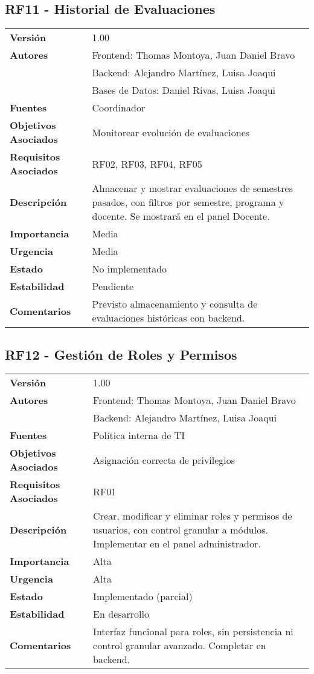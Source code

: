 \documentclass{article}
\begin{document}
\subsection*{RF11 - Historial de Evaluaciones}
\begin{longtable}{>{\bfseries}l p{}}
Versión & 1.00 \\
Autores & Frontend: Thomas Montoya, Juan Daniel Bravo \\ 
        & Backend: Alejandro Martínez, Luisa Joaqui \\ 
        & Bases de Datos: Daniel Rivas, Luisa Joaqui \\
Fuentes & Coordinador \\
Objetivos Asociados & Monitorear evolución de evaluaciones \\
Requisitos Asociados & RF02, RF03, RF04, RF05 \\
Descripción & Almacenar y mostrar evaluaciones de semestres pasados, con filtros por semestre, programa y docente. Se mostrará en el panel Docente. \\
Importancia & Media \\
Urgencia & Media \\
Estado & No implementado \\
Estabilidad & Pendiente \\
Comentarios & Previsto almacenamiento y consulta de evaluaciones históricas con backend. \\
\end{longtable}

\subsection*{RF12 - Gestión de Roles y Permisos}
\begin{longtable}{>{\bfseries}l p{}}
Versión & 1.00 \\
Autores & Frontend: Thomas Montoya, Juan Daniel Bravo \\ 
        & Backend: Alejandro Martínez, Luisa Joaqui \\
Fuentes & Política interna de TI \\
Objetivos Asociados & Asignación correcta de privilegios \\
Requisitos Asociados & RF01 \\
Descripción & Crear, modificar y eliminar roles y permisos de usuarios, con control granular a módulos. Implementar en el panel administrador. \\
Importancia & Alta \\
Urgencia & Alta \\
Estado & Implementado (parcial) \\
Estabilidad & En desarrollo \\
Comentarios & Interfaz funcional para roles, sin persistencia ni control granular avanzado. Completar en backend. \\
\end{longtable}
\end{document}
